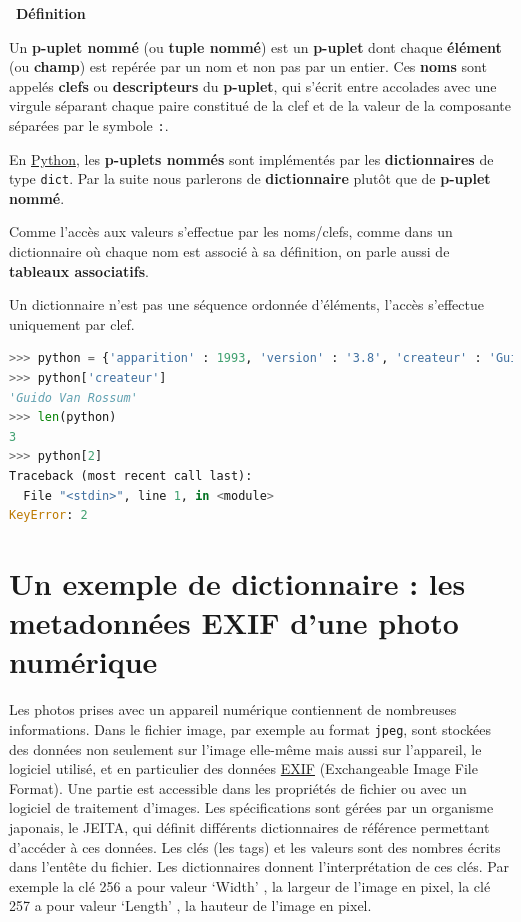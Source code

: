 \documentclass[
  11pt,
]{article}
\newcommand{\passthrough}[1]{#1}
\newcounter{prop}
\newcounter{def}
\newenvironment{definition}[1]
{\par \medskip   \addtocounter{def}{1} \noindent  
\begin{bclogo}[arrondi =0.1,  ombre = true, barre=none, logo=\bcbook, marge=4]{~\textbf{Définition} \textbf{\thedef} {\itshape #1} }  \par}
{
\end{bclogo}
 \par \bigskip }
\newcounter{logi}
\begin{document}
\begin{definition}{}

Un \textbf{p-uplet nommé} (ou \textbf{tuple nommé}) est un
\textbf{p-uplet} dont chaque \textbf{élément} (ou \textbf{champ}) est
repérée par un nom et non pas par un entier. Ces \textbf{noms} sont
appelés \textbf{clefs} ou \textbf{descripteurs} du \textbf{p-uplet}, qui
s'écrit entre accolades avec une virgule séparant chaque paire constitué
de la clef et de la valeur de la composante séparées par le symbole
\passthrough{\lstinline!:!}.

En
\href{https://docs.python.org/3/tutorial/datastructures.html}{Python},
les \textbf{p-uplets nommés} sont implémentés par les
\textbf{dictionnaires} de type \passthrough{\lstinline!dict!}. Par la
suite nous parlerons de \textbf{dictionnaire} plutôt que de
\textbf{p-uplet nommé}.

Comme l'accès aux valeurs s'effectue par les noms/clefs, comme dans un
dictionnaire où chaque nom est associé à sa définition, on parle aussi
de \textbf{tableaux associatifs}.

Un dictionnaire n'est pas une séquence ordonnée d'éléments, l'accès
s'effectue uniquement par clef.

\begin{lstlisting}[language=Python]
>>> python = {'apparition' : 1993, 'version' : '3.8', 'createur' : 'Guido Van Rossum'}
>>> python['createur']
'Guido Van Rossum'
>>> len(python)
3
>>> python[2]
Traceback (most recent call last):
  File "<stdin>", line 1, in <module>
KeyError: 2
\end{lstlisting}

\end{definition}

\hypertarget{un-exemple-de-dictionnaire-les-metadonnuxe9es-exif-dune-photo-numuxe9rique}{%
\section{Un exemple de dictionnaire : les metadonnées EXIF d'une photo
numérique}\label{un-exemple-de-dictionnaire-les-metadonnuxe9es-exif-dune-photo-numuxe9rique}}

Les photos prises avec un appareil numérique contiennent de nombreuses
informations. Dans le fichier image, par exemple au format
\passthrough{\lstinline!jpeg!}, sont stockées des données non seulement
sur l'image elle-même mais aussi sur l'appareil, le logiciel utilisé, et
en particulier des données
\href{https://fr.wikipedia.org/wiki/Exchangeable_image_file_format}{EXIF}
(Exchangeable Image File Format). Une partie est accessible dans les
propriétés de fichier ou avec un logiciel de traitement d'images. Les
spécifications sont gérées par un organisme japonais, le JEITA, qui
définit différents dictionnaires de référence permettant d'accéder à ces
données. Les clés (les tags) et les valeurs sont des nombres écrits dans
l'entête du fichier. Les dictionnaires donnent l'interprétation de ces
clés. Par exemple la clé 256 a pour valeur `Width' , la largeur de
l'image en pixel, la clé 257 a pour valeur `Length' , la hauteur de
l'image en pixel.
\end{document}
